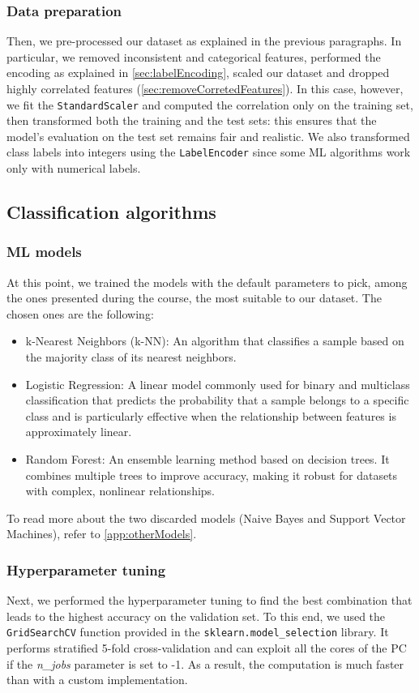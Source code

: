 \documentclass[acmlarge,nonacm]{acmart}
\begin{document}
\subsubsection{Data preparation}
Then, we pre-processed our dataset as explained in the previous paragraphs. In particular, we removed inconsistent and categorical features, performed the encoding as explained in \cref{sec:labelEncoding}, scaled our dataset and dropped highly correlated features (\cref{sec:removeCorretedFeatures}). In this case, however, we fit the \verb|StandardScaler| and computed the correlation only on the training set, then transformed both the training and the test sets: this ensures that the model's evaluation on the test set remains fair and realistic. We also transformed class labels into integers using the \verb|LabelEncoder| since some ML algorithms work only with numerical labels.

\subsection{Classification algorithms}
\subsubsection{ML models}
At this point, we trained the models with the default parameters to pick, among the ones presented during the course, the most suitable to our dataset. The chosen ones are the following:
\begin{itemize}
    \item k-Nearest Neighbors (k-NN): An algorithm that classifies a sample based on the majority class of its nearest neighbors.
    \item Logistic Regression: A linear model commonly used for binary and multiclass classification that predicts the probability that a sample belongs to a specific class and is particularly effective when the relationship between features is approximately linear.
    \item Random Forest: An ensemble learning method based on decision trees. It combines multiple trees to improve accuracy, making it robust for datasets with complex, nonlinear relationships.
\end{itemize}
To read more about the two discarded models (Naive Bayes and Support Vector Machines), refer to \cref{app:otherModels}. 

\subsubsection{Hyperparameter tuning}
Next, we performed the hyperparameter tuning to find the best combination that leads to the highest accuracy on the validation set. To this end, we used the \verb|GridSearchCV| function provided in the \verb|sklearn.model_selection| library. It performs stratified 5-fold cross-validation and can exploit all the cores of the PC if the \emph{n\_jobs} parameter is set to -1. As a result, the computation is much faster than with a custom implementation.
\end{document}
